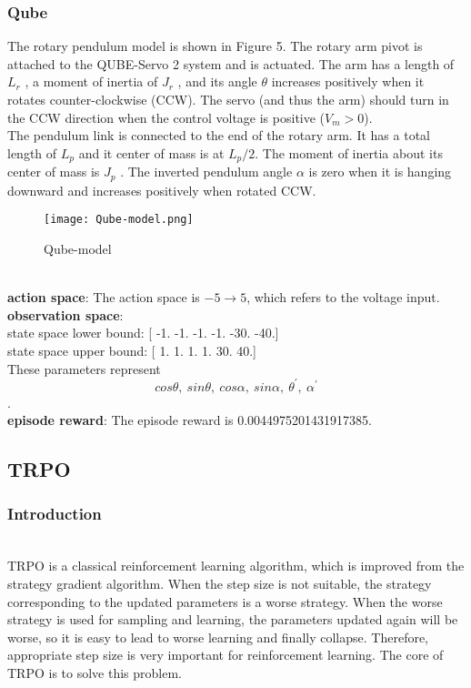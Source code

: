 \documentclass[12pt]{article}
\begin{document}
\subsubsection{Qube}
The rotary pendulum model is shown in Figure 5. The rotary arm pivot is attached to the QUBE-Servo 2 system
and is actuated. The arm has a length of $L_r$ , a moment of inertia of $J_r$ , and its angle $\theta$ increases positively when it
rotates counter-clockwise (CCW). The servo (and thus the arm) should turn in the CCW direction when the control
voltage is positive ($V_m > 0$).\\
The pendulum link is connected to the end of the rotary arm. It has a total length of $L_p$ and it center of mass is
at $L_p /2$. The moment of inertia about its center of mass is $J_p$ . The inverted pendulum angle $\alpha$ is zero when it is
hanging downward and increases positively when rotated CCW.
\begin{figure}[H]
  \centering
  \texttt{[image: Qube-model.png]}
  \caption{Qube-model}
\end{figure}
~\\\textbf{action space}: The action space is $-5 \rightarrow 5$, which refers to the voltage input.\\
\textbf{observation space}: \\
state space lower bound:  [ -1.  -1.  -1.  -1. -30. -40.]\\
state space upper bound:  [ 1.  1.  1.  1. 30. 40.]\\
These parameters represent $$cos\theta,\ sin\theta,\ cos\alpha,\ sin\alpha,\ \theta^\prime,\ \alpha^\prime$$.\\
\textbf{episode reward}: The episode reward is 0.0044975201431917385.

\newpage
\subsection{TRPO}

\subsubsection{Introduction}

~\\\indent TRPO is a classical reinforcement learning algorithm, which is improved from the strategy gradient algorithm. When the step size is not suitable, the strategy corresponding to the updated parameters is a worse strategy. When the worse strategy is used for sampling and learning, the parameters updated again will be worse, so it is easy to lead to worse learning and finally collapse. Therefore, appropriate step size is very important for reinforcement learning. The core of TRPO is to solve this problem.
\end{document}
